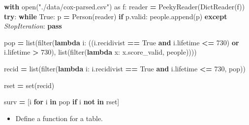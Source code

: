 \documentclass[
]{book}
\newenvironment{Shaded}{\begin{snugshade}}{\end{snugshade}}
\newcommand{\BuiltInTok}[1]{#1}
\newcommand{\ControlFlowTok}[1]{\textcolor[rgb]{0.13,0.29,0.53}{\textbf{#1}}}
\newcommand{\DecValTok}[1]{\textcolor[rgb]{0.00,0.00,0.81}{#1}}
\newcommand{\ImportTok}[1]{#1}
\newcommand{\KeywordTok}[1]{\textcolor[rgb]{0.13,0.29,0.53}{\textbf{#1}}}
\newcommand{\NormalTok}[1]{#1}
\newcommand{\OperatorTok}[1]{\textcolor[rgb]{0.81,0.36,0.00}{\textbf{#1}}}
\newcommand{\PreprocessorTok}[1]{\textcolor[rgb]{0.56,0.35,0.01}{\textit{#1}}}
\newcommand{\StringTok}[1]{\textcolor[rgb]{0.31,0.60,0.02}{#1}}
\newcommand{\VariableTok}[1]{\textcolor[rgb]{0.00,0.00,0.00}{#1}}
\providecommand{\tightlist}{%
  \setlength{\itemsep}{0pt}\setlength{\parskip}{0pt}}
\begin{document}
\begin{Shaded}
\begin{Highlighting}[]

\ControlFlowTok{with} \BuiltInTok{open}\NormalTok{(}\StringTok{"./data/cox{-}parsed.csv"}\NormalTok{) }\ImportTok{as}\NormalTok{ f:}
\NormalTok{    reader }\OperatorTok{=}\NormalTok{ PeekyReader(DictReader(f))}
    \ControlFlowTok{try}\NormalTok{:}
        \ControlFlowTok{while} \VariableTok{True}\NormalTok{:}
\NormalTok{            p }\OperatorTok{=}\NormalTok{ Person(reader)}
            \ControlFlowTok{if}\NormalTok{ p.valid:}
\NormalTok{                people.append(p)}
    \ControlFlowTok{except} \PreprocessorTok{StopIteration}\NormalTok{:}
        \ControlFlowTok{pass}
\end{Highlighting}
\end{Shaded}

\begin{Shaded}
\begin{Highlighting}[]

\NormalTok{pop }\OperatorTok{=} \BuiltInTok{list}\NormalTok{(}\BuiltInTok{filter}\NormalTok{(}\KeywordTok{lambda}\NormalTok{ i: ((i.recidivist }\OperatorTok{==} \VariableTok{True} \KeywordTok{and}\NormalTok{ i.lifetime }\OperatorTok{\textless{}=} \DecValTok{730}\NormalTok{) }\KeywordTok{or}
\NormalTok{                              i.lifetime }\OperatorTok{\textgreater{}} \DecValTok{730}\NormalTok{), }\BuiltInTok{list}\NormalTok{(}\BuiltInTok{filter}\NormalTok{(}\KeywordTok{lambda}\NormalTok{ x: x.score\_valid, people))))}

\NormalTok{recid }\OperatorTok{=} \BuiltInTok{list}\NormalTok{(}\BuiltInTok{filter}\NormalTok{(}\KeywordTok{lambda}\NormalTok{ i: i.recidivist }\OperatorTok{==} \VariableTok{True} \KeywordTok{and}\NormalTok{ i.lifetime }\OperatorTok{\textless{}=} \DecValTok{730}\NormalTok{, pop))}

\NormalTok{rset }\OperatorTok{=} \BuiltInTok{set}\NormalTok{(recid)}

\NormalTok{surv }\OperatorTok{=}\NormalTok{ [i }\ControlFlowTok{for}\NormalTok{ i }\KeywordTok{in}\NormalTok{ pop }\ControlFlowTok{if}\NormalTok{ i }\KeywordTok{not} \KeywordTok{in}\NormalTok{ rset]}
\end{Highlighting}
\end{Shaded}

\begin{itemize}
\tightlist
\item
  Define a function for a table.
\end{itemize}
\end{document}
